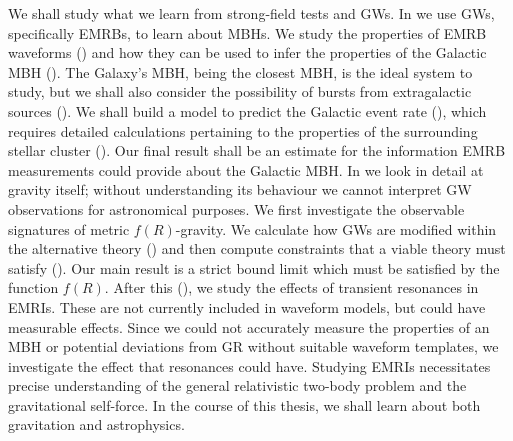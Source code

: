 We shall study what we learn from strong-field tests and GWs. In  we use GWs, specifically EMRBs, to learn about MBHs. We study the properties of EMRB waveforms () and how they can be used to infer the properties of the Galactic MBH (). The Galaxy's MBH, being the closest MBH, is the ideal system to study, but we shall also consider the possibility of bursts from extragalactic sources (). We shall build a model to predict the Galactic event rate (), which requires detailed calculations pertaining to the properties of the surrounding stellar cluster (). Our final result shall be an estimate for the information EMRB measurements could provide about the Galactic MBH. In  we look in detail at gravity itself; without understanding its behaviour we cannot interpret GW observations for astronomical purposes. We first investigate the observable signatures of metric $f(R)$-gravity. We calculate how GWs are modified within the alternative theory () and then compute constraints that a viable theory must satisfy (). Our main result is a strict bound limit which must be satisfied by the function $f(R)$. After this (), we study the effects of transient resonances in EMRIs. These are not currently included in waveform models, but could have measurable effects. Since we could not accurately measure the properties of an MBH or potential deviations from GR without suitable waveform templates, we investigate the effect that resonances could have. Studying EMRIs necessitates precise understanding of the general relativistic two-body problem and the gravitational self-force. In the course of this thesis, we shall learn about both gravitation and astrophysics.
